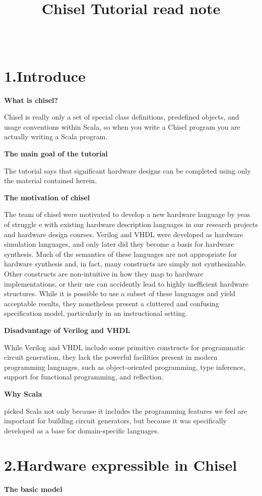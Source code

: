 \documentclass[11pt]{article}
\title{Chisel Tutorial read note}
\author{\Name \\ \Email}
\begin{document}
\maketitle
\section*{1.Introduce}
\textbf{What is chisel?}

Chisel is really only a set of special class definitions, predefined objects, and usage conventions within Scala, so when you write a Chisel program you are actually writing a Scala program.

\textbf{The main goal of the tutorial}

The tutorial says that significant hardware designs can be completed using only the material contained herein.

\textbf{The motivation of chisel}

The team of chisel were motivated to develop a new hardware language by yeas of struggle e with existing hardware description languages in our research projects and hardware design courses. Verilog and VHDL were developed as hardware simulation languages, and only later did they become a basis for hardware synthesis. Much of the semantics of these languages are
not appropriate for hardware synthesis and, in fact,
many constructs are simply not synthesizable. Other
constructs are non-intuitive in how they map to hardware implementations, or their use can accidently lead
to highly inefficient hardware structures. While it is
possible to use a subset of these languages and yield
acceptable results, they nonetheless present a cluttered
and confusing specification model, particularly in an
instructional setting.

\textbf{Disadvantage of Verilog and VHDL}

While Verilog and VHDL include some
primitive constructs for programmatic circuit generation, they lack the powerful facilities present in modern programming languages, such as object-oriented
programming, type inference, support for functional
programming, and reflection.

\textbf{Why Scala}

picked Scala not only because it includes the programming features we feel are important for building circuit generators, but because it was specifically developed as a base for domain-specific languages.
\section*{2.Hardware expressible in Chisel}
\textbf{The basic model}
\end{document}
